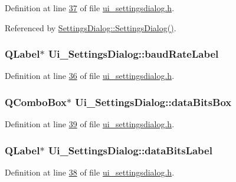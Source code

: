 Definition at line \hyperlink{a00054_source_l00037}{37} of file \hyperlink{a00054_source}{ui\+\_\+settingsdialog.\+h}.



Referenced by \hyperlink{a00044_source_l00052}{Settings\+Dialog\+::\+Settings\+Dialog()}.

\hypertarget{a00029_a57e59712bae4f482b1ff1d61c81471e8}{
\subsubsection[{baud\+Rate\+Label}]{\setlength{\rightskip}{0pt plus 5cm}Q\+Label$\ast$ Ui\+\_\+\+Settings\+Dialog\+::baud\+Rate\+Label}}\label{a00029_a57e59712bae4f482b1ff1d61c81471e8}


Definition at line \hyperlink{a00054_source_l00036}{36} of file \hyperlink{a00054_source}{ui\+\_\+settingsdialog.\+h}.

\hypertarget{a00029_ab6082bb196e22af4ca04a04db3402166}{
\subsubsection[{data\+Bits\+Box}]{\setlength{\rightskip}{0pt plus 5cm}Q\+Combo\+Box$\ast$ Ui\+\_\+\+Settings\+Dialog\+::data\+Bits\+Box}}\label{a00029_ab6082bb196e22af4ca04a04db3402166}


Definition at line \hyperlink{a00054_source_l00039}{39} of file \hyperlink{a00054_source}{ui\+\_\+settingsdialog.\+h}.

\hypertarget{a00029_a4d827d5f217aa166e228b0e2c9c5aaf7}{
\subsubsection[{data\+Bits\+Label}]{\setlength{\rightskip}{0pt plus 5cm}Q\+Label$\ast$ Ui\+\_\+\+Settings\+Dialog\+::data\+Bits\+Label}}\label{a00029_a4d827d5f217aa166e228b0e2c9c5aaf7}


Definition at line \hyperlink{a00054_source_l00038}{38} of file \hyperlink{a00054_source}{ui\+\_\+settingsdialog.\+h}.

